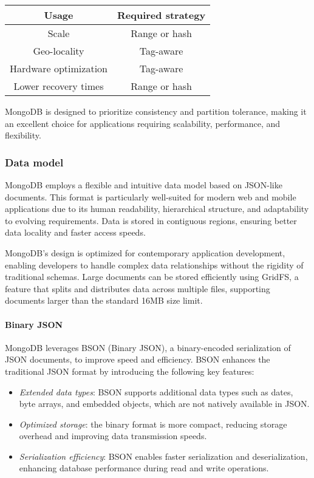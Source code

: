 \begin{table}[H]
    \centering
    \begin{tabular}{|c|c|}
        \hline
        \textbf{Usage} & \textbf{Required strategy} \\ \hline
        Scale & Range or hash \\ \hline
        Geo-locality & Tag-aware \\ \hline
        Hardware optimization & Tag-aware \\ \hline
        Lower recovery times & Range or hash \\ \hline
    \end{tabular}
\end{table}
MongoDB is designed to prioritize consistency and partition tolerance, making it an excellent choice for applications requiring scalability, performance, and flexibility.

\subsubsection{Data model}
MongoDB employs a flexible and intuitive data model based on JSON-like documents. 
This format is particularly well-suited for modern web and mobile applications due to its human readability, hierarchical structure, and adaptability to evolving requirements. 
Data is stored in contiguous regions, ensuring better data locality and faster access speeds.

MongoDB's design is optimized for contemporary application development, enabling developers to handle complex data relationships without the rigidity of traditional schemas. 
Large documents can be stored efficiently using GridFS, a feature that splits and distributes data across multiple files, supporting documents larger than the standard 16MB size limit.

\paragraph*{Binary JSON} 
MongoDB leverages BSON (Binary JSON), a binary-encoded serialization of JSON documents, to improve speed and efficiency. 
BSON enhances the traditional JSON format by introducing the following key features:
\begin{itemize} 
    \item \textit{Extended data types}: BSON supports additional data types such as dates, byte arrays, and embedded objects, which are not natively available in JSON. 
    \item \textit{Optimized storage}: the binary format is more compact, reducing storage overhead and improving data transmission speeds. 
    \item \textit{Serialization efficiency}: BSON enables faster serialization and deserialization, enhancing database performance during read and write operations. 
\end{itemize}

